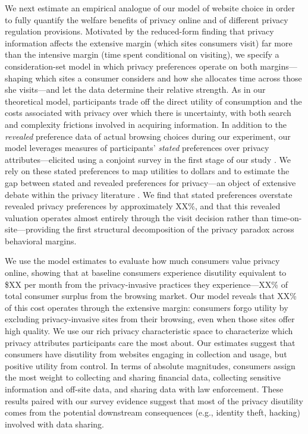 \documentclass[12pt]{article}
\theoremstyle{definition}
\theoremstyle{remark}
\begin{document}
We next estimate an empirical analogue of our model of website choice in order to fully quantify the welfare benefits of privacy online and of different privacy regulation provisions. Motivated by the reduced-form finding that privacy information affects the extensive margin (which sites consumers visit) far more than the intensive margin (time spent conditional on visiting), we specify a consideration-set model in which privacy preferences operate on both margins---shaping which sites a consumer considers and how she allocates time across those she visits---and let the data determine their relative strength. As in our theoretical model, participants trade off the direct utility of consumption and the costs associated with privacy over which there is uncertainty, with both search and complexity frictions involved in acquiring information. In addition to the \textit{revealed} preference data of actual browsing choices during our experiment, our model leverages measures of participants' \textit{stated} preferences over privacy attributes---elicited using a conjoint survey in the first stage of our study \citep{ALLENBY2019151}. We rely on these stated preferences to map utilities to dollars and to estimate the gap between stated and revealed preferences for privacy---an object of extensive debate within the privacy literature \citep{norberg2007privacy, f4d6c48d-b77c-3568-b51c-5946aee2b9de, athey2025digital}. We find that stated preferences overstate revealed privacy preferences by approximately XX\%, and that this revealed valuation operates almost entirely through the visit decision rather than time-on-site---providing the first structural decomposition of the privacy paradox across behavioral margins. %

We use the model estimates to evaluate how much consumers value privacy online, showing that at baseline consumers experience disutility equivalent to \$XX per month from the privacy-invasive practices they experience---XX\% of total consumer surplus from the browsing market. %
Our model reveals that XX\% of this cost operates through the extensive margin: consumers forgo utility by excluding privacy-invasive sites from their browsing, even when those sites offer high quality. %
We use our rich privacy characteristic space to characterize which privacy attributes participants care the most about. Our estimates suggest that consumers have disutility from websites engaging in collection and usage, but positive utility from control. In terms of absolute magnitudes, consumers assign the most weight to collecting and sharing financial data, collecting sensitive information and off-site data, and sharing data with law enforcement. These results paired with our survey evidence suggest that most of the privacy disutility comes from the potential downstream consequences (e.g., identity theft, hacking) involved with data sharing.
\end{document}
